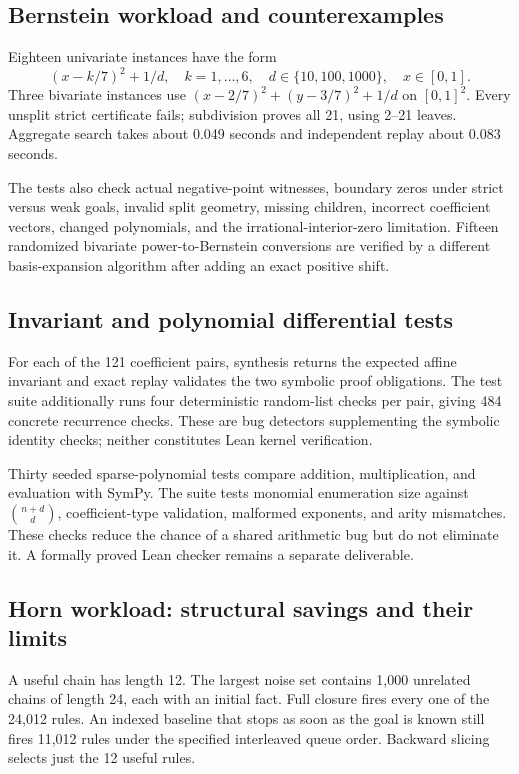 \documentclass[11pt,a4paper]{article}
\begin{document}
\subsection{Bernstein workload and counterexamples}
Eighteen univariate instances have the form
\[
 (x-k/7)^2+1/d,\quad k=1,\ldots,6,\quad d\in\{10,100,1000\},
 \quad x\in[0,1].
\]
Three bivariate instances use $(x-2/7)^2+(y-3/7)^2+1/d$ on $[0,1]^2$. Every unsplit strict certificate fails; subdivision proves all 21, using 2--21 leaves. Aggregate search takes about 0.049 seconds and independent replay about 0.083 seconds.

The tests also check actual negative-point witnesses, boundary zeros under strict versus weak goals, invalid split geometry, missing children, incorrect coefficient vectors, changed polynomials, and the irrational-interior-zero limitation. Fifteen randomized bivariate power-to-Bernstein conversions are verified by a different basis-expansion algorithm after adding an exact positive shift.

\subsection{Invariant and polynomial differential tests}
For each of the 121 coefficient pairs, synthesis returns the expected affine invariant and exact replay validates the two symbolic proof obligations. The test suite additionally runs four deterministic random-list checks per pair, giving 484 concrete recurrence checks. These are bug detectors supplementing the symbolic identity checks; neither constitutes Lean kernel verification.

Thirty seeded sparse-polynomial tests compare addition, multiplication, and evaluation with SymPy. The suite tests monomial enumeration size against $\binom{n+d}{d}$, coefficient-type validation, malformed exponents, and arity mismatches. These checks reduce the chance of a shared arithmetic bug but do not eliminate it. A formally proved Lean checker remains a separate deliverable.

\subsection{Horn workload: structural savings and their limits}
A useful chain has length 12. The largest noise set contains 1,000 unrelated chains of length 24, each with an initial fact. Full closure fires every one of the 24,012 rules. An indexed baseline that stops as soon as the goal is known still fires 11,012 rules under the specified interleaved queue order. Backward slicing selects just the 12 useful rules.
\end{document}
